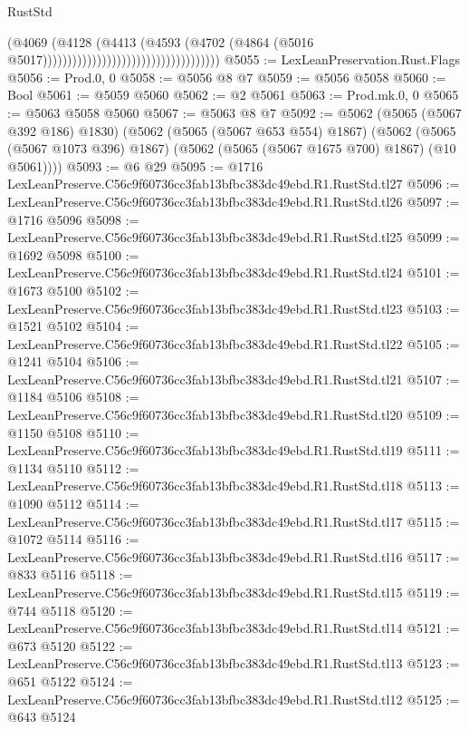 \begin{lexlean}{RustStd}
\begin{coremodule}
                                                              (@4069
                                                                (@4128
                                                                  (@4413
                                                                    (@4593
                                                                      (@4702
                                                                        (@4864
                                                                          (@5016
                                                                            @5017))))))))))))))))))))))))))))))))))))
@5055 := LexLeanPreservation.Rust.Flags
@5056 := Prod.{0, 0}
@5058 := @5056 @8 @7
@5059 := @5056 @5058
@5060 := Bool
@5061 := @5059 @5060
@5062 := @2 @5061
@5063 := Prod.mk.{0, 0}
@5065 := @5063 @5058 @5060
@5067 := @5063 @8 @7
@5092 := @5062
    (@5065 (@5067 @392 @186) @1830)
    (@5062
      (@5065 (@5067 @653 @554) @1867)
      (@5062 (@5065 (@5067 @1073 @396) @1867) (@5062 (@5065 (@5067 @1675 @700) @1867) (@10 @5061))))
@5093 := @6 @29
@5095 := @1716 LexLeanPreserve.C56c9f60736cc3fab13bfbc383dc49ebd.R1.RustStd.tl27
@5096 := LexLeanPreserve.C56c9f60736cc3fab13bfbc383dc49ebd.R1.RustStd.tl26
@5097 := @1716 @5096
@5098 := LexLeanPreserve.C56c9f60736cc3fab13bfbc383dc49ebd.R1.RustStd.tl25
@5099 := @1692 @5098
@5100 := LexLeanPreserve.C56c9f60736cc3fab13bfbc383dc49ebd.R1.RustStd.tl24
@5101 := @1673 @5100
@5102 := LexLeanPreserve.C56c9f60736cc3fab13bfbc383dc49ebd.R1.RustStd.tl23
@5103 := @1521 @5102
@5104 := LexLeanPreserve.C56c9f60736cc3fab13bfbc383dc49ebd.R1.RustStd.tl22
@5105 := @1241 @5104
@5106 := LexLeanPreserve.C56c9f60736cc3fab13bfbc383dc49ebd.R1.RustStd.tl21
@5107 := @1184 @5106
@5108 := LexLeanPreserve.C56c9f60736cc3fab13bfbc383dc49ebd.R1.RustStd.tl20
@5109 := @1150 @5108
@5110 := LexLeanPreserve.C56c9f60736cc3fab13bfbc383dc49ebd.R1.RustStd.tl19
@5111 := @1134 @5110
@5112 := LexLeanPreserve.C56c9f60736cc3fab13bfbc383dc49ebd.R1.RustStd.tl18
@5113 := @1090 @5112
@5114 := LexLeanPreserve.C56c9f60736cc3fab13bfbc383dc49ebd.R1.RustStd.tl17
@5115 := @1072 @5114
@5116 := LexLeanPreserve.C56c9f60736cc3fab13bfbc383dc49ebd.R1.RustStd.tl16
@5117 := @833 @5116
@5118 := LexLeanPreserve.C56c9f60736cc3fab13bfbc383dc49ebd.R1.RustStd.tl15
@5119 := @744 @5118
@5120 := LexLeanPreserve.C56c9f60736cc3fab13bfbc383dc49ebd.R1.RustStd.tl14
@5121 := @673 @5120
@5122 := LexLeanPreserve.C56c9f60736cc3fab13bfbc383dc49ebd.R1.RustStd.tl13
@5123 := @651 @5122
@5124 := LexLeanPreserve.C56c9f60736cc3fab13bfbc383dc49ebd.R1.RustStd.tl12
@5125 := @643 @5124

\end{coremodule}
\end{lexlean}
